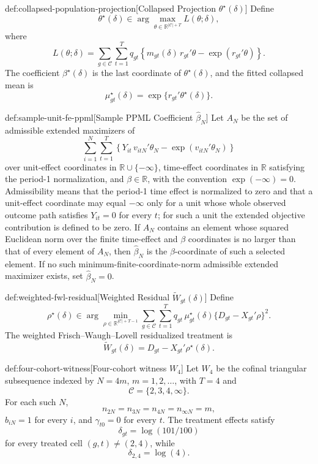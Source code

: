 \begin{definitionv}{def:collapsed-population-projection}[Collapsed Projection \(\theta^\star(\delta)\)]
Define
\[
\theta^\star(\delta)\in
\arg\max_{\theta\in\mathbb R^{|\mathcal C|+T}} L(\theta;\delta),
\]
where
\[
L(\theta;\delta)
=
\sum_{g\in\mathcal C}\sum_{t=1}^T
q_{gt}
\left\{
m_{gt}(\delta)\,r_{gt}'\theta-\exp(r_{gt}'\theta)
\right\}.
\]
The coefficient \(\beta^\star(\delta)\) is the last coordinate of \(\theta^\star(\delta)\), and the fitted collapsed mean is
\[
\mu^\star_{gt}(\delta)=\exp\{r_{gt}'\theta^\star(\delta)\}.
\]
\end{definitionv}

\begin{definitionv}{def:sample-unit-fe-ppml}[Sample PPML Coefficient \(\hat\beta_N\)]
Let \(A_N\) be the set of admissible extended maximizers of
\[
\sum_{i=1}^N\sum_{t=1}^T
\left\{
Y_{it}\,v_{itN}'\theta_N-\exp(v_{itN}'\theta_N)
\right\}
\]
over unit-effect coordinates in \(\mathbb R\cup\{-\infty\}\), time-effect coordinates in \(\mathbb R\) satisfying the period-1 normalization, and \(\beta\in\mathbb R\), with the convention \(\exp(-\infty)=0\). Admissibility means that the period-1 time effect is normalized to zero and that a unit-effect coordinate may equal \(-\infty\) only for a unit whose whole observed outcome path satisfies \(Y_{it}=0\) for every \(t\); for such a unit the extended objective contribution is defined to be zero. If \(A_N\) contains an element whose squared Euclidean norm over the finite time-effect and \(\beta\) coordinates is no larger than that of every element of \(A_N\), then \(\hat\beta_N\) is the \(\beta\)-coordinate of such a selected element. If no such minimum-finite-coordinate-norm admissible extended maximizer exists, set \(\hat\beta_N=0\).
\end{definitionv}

\begin{definitionv}{def:weighted-fwl-residual}[Weighted Residual \(\widetilde W_{gt}(\delta)\)]
Define
\[
\rho^\star(\delta)
\in
\arg\min_{\rho\in\mathbb R^{|\mathcal C|+T-1}}
\sum_{g\in\mathcal C}\sum_{t=1}^T
q_{gt}\,\mu^\star_{gt}(\delta)\{D_{gt}-X_{gt}'\rho\}^2.
\]
The weighted Frisch--Waugh--Lovell residualized treatment is
\[
\widetilde W_{gt}(\delta)=D_{gt}-X_{gt}'\rho^\star(\delta).
\]
\end{definitionv}

\begin{definitionv}{def:four-cohort-witness}[Four-cohort witness $W_4$]
Let $W_4$ be the cofinal triangular subsequence indexed by $N=4m$, $m=1,2,\ldots$, with $T=4$ and
\[
\mathcal C=\{2,3,4,\infty\}.
\]
For each such $N$,
\[
n_{2N}=n_{3N}=n_{4N}=n_{\infty N}=m,
\]
$b_{iN}=1$ for every $i$, and $\gamma_{t0}=0$ for every $t$. The treatment effects satisfy
\[
\delta_{gt}=\log(101/100)
\]
for every treated cell $(g,t)\ne(2,4)$, while
\[
\delta_{2,4}=\log(4).
\]
\end{definitionv}

